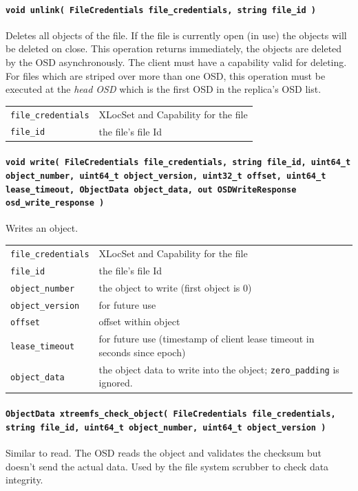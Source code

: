 \paragraph{\texttt{void unlink( FileCredentials file\_credentials, string file\_id~)}}
Deletes all objects of the file. If the file is currently open (in use) the objects will be deleted on close. This operation returns immediately, the objects are deleted by the OSD asynchronously. The client must have a capability valid for deleting. For files which are striped over more than one OSD, this operation must be executed at the \textit{head OSD} which is the first OSD in the replica's OSD list.

\begin{tabularx}{\textwidth}{lX}
 \texttt{file\_credentials} & XLocSet and Capability for the file\\
 \texttt{file\_id} & the file's file Id\\
\end{tabularx}



\paragraph{\texttt{void write( FileCredentials file\_credentials, string file\_id, uint64\_t object\_number, uint64\_t object\_version, uint32\_t offset, uint64\_t lease\_timeout, ObjectData object\_data, out OSDWriteResponse osd\_write\_response~)}}
Writes an object.

\begin{tabularx}{\textwidth}{lX}
 \texttt{file\_credentials} & XLocSet and Capability for the file\\
 \texttt{file\_id} & the file's file Id\\
 \texttt{object\_number} & the object to write (first object is 0)\\
 \texttt{object\_version} & for future use\\
 \texttt{offset} & offset within object\\
 \texttt{lease\_timeout} & for future use (timestamp of client lease timeout in seconds since epoch)\\
 \texttt{object\_data} & the object data to write into the object; \texttt{zero\_padding} is ignored.\\
\end{tabularx}


\paragraph{\texttt{ObjectData xtreemfs\_check\_object( FileCredentials file\_credentials, string file\_id, uint64\_t object\_number, uint64\_t object\_version~)}}
Similar to read. The OSD reads the object and validates the checksum but doesn't send the actual data. Used by the file system scrubber to check data integrity.

